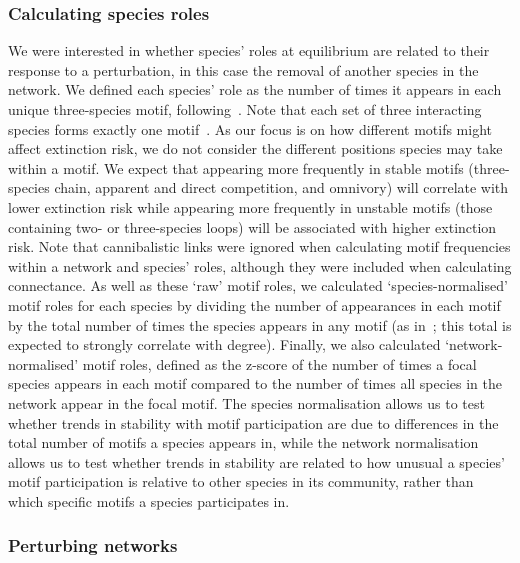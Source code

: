 \documentclass[12pt]{article}
\begin{document}
\begin{spacing}{2.0}
    
    	\subsubsection*{Calculating species roles}
    
    
    		We were interested in whether species' roles at equilibrium are related to their response to a perturbation, in this case the removal of another species in the network. We defined each species' role as the number of times it appears in each unique three-species motif, following~\citet{Stouffer2012,Cirtwill2015}. Note that each set of three interacting species forms exactly one motif~\citep{Cirtwill2018FoodWebs}. As our focus is on how different motifs might affect extinction risk, we do not consider the different positions species may take within a motif. We expect that appearing more frequently in stable motifs (three-species chain, apparent and direct competition, and omnivory) will correlate with lower extinction risk while appearing more frequently in unstable motifs (those containing two- or three-species loops) will be associated with higher extinction risk.	Note that cannibalistic links were ignored when calculating motif frequencies within a network and species' roles, although they were included when calculating connectance. As well as these `raw' motif roles, we calculated `species-normalised' motif roles for each species by dividing the number of appearances in each motif by the total number of times the species appears in any motif (as in~\citet{Cirtwill2015}; this total is expected to strongly correlate with degree). Finally, we also calculated `network-normalised' motif roles, defined as the z-score of the number of times a focal species appears in each motif compared to the number of times all species in the network appear in the focal motif.
    		The species normalisation allows us to test whether trends in stability with motif participation are due to differences in the total number of motifs a species appears in, while the network normalisation allows us to test whether trends in stability are related to how unusual a species' motif participation is relative to other species in its community, rather than which specific motifs a species participates in.
    
    	\subsubsection*{Perturbing networks}
    

\end{spacing}
\end{document}
